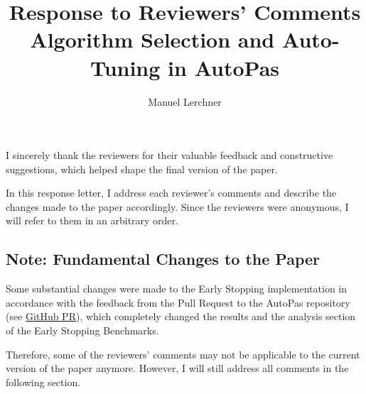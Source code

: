 \documentclass[12pt,a4paper]{article}
\title{Response to Reviewers' Comments\\Algorithm Selection and Auto-Tuning in AutoPas}
\author{Manuel Lerchner}
\date{}
\begin{document}
\maketitle

I sincerely thank the reviewers for their valuable feedback and constructive suggestions, which helped shape the final version of the paper.

In this response letter, I address each reviewer's comments and describe the changes made to the paper accordingly. Since the reviewers were anonymous, I will refer to them in an arbitrary order.

      {\color{red}
            \subsection*{Note: Fundamental Changes to the Paper}

            Some substantial changes were made to the Early Stopping implementation in accordance with the feedback from the Pull Request to the AutoPas repository
            (see \href{https://github.com/AutoPas/AutoPas/pull/995}{GitHub PR}), which completely changed the results and the analysis section of the Early Stopping Benchmarks.

            Therefore, some of the reviewers' comments may not be applicable to the current version of the paper anymore. However, I will still address all comments in the following section.
      }
\end{document}

